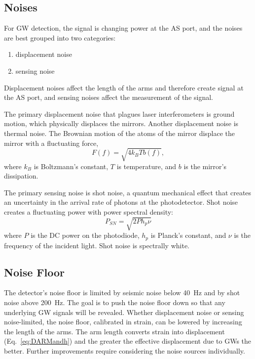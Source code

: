 \subsection{Noises}
For GW detection, the signal is changing power at the AS port, and the
noises are best grouped into two categories:
\begin{enumerate}
\item displacement noise \vspace{-10 pt}
\item sensing noise
\end{enumerate}
Displacement noises affect the length of the arms and therefore create
signal at the AS port, and sensing noises affect the measurement of
the signal. 

The primary displacement noise that plagues laser interferometers is
ground motion, which physically displaces the mirrors. Another
displacement noise is thermal noise. The Brownian motion of the atoms
of the mirror displace the mirror with a fluctuating force,
\begin{equation}
F(f) = \sqrt{4k_BTb(f)},
\end{equation}
where $k_B$ is Boltzmann's constant, $T$ is temperature, and $b$ is
the mirror's dissipation.

The primary sensing noise is shot noise, a quantum mechanical effect
that creates an uncertainty in the arrival rate of photons at the
photodetector. Shot noise creates a fluctuating power with power
spectral density:
\begin{equation}
P_{SN} = \sqrt{2 P h_p \nu}
\label{eq:shotnoise}
\end{equation}
where $P$ is the DC power on the photodiode, $h_p$ is Planck's
constant, and $\nu$ is the frequency of the incident light. Shot noise
is spectrally white.

\subsection{Noise Floor}
The detector's noise floor is limited by seismic noise below 40~Hz and
by shot noise above 200~Hz. The goal is to push the noise floor down
so that any underlying GW signals will be revealed. Whether
displacement noise or sensing noise-limited, the noise floor,
calibrated in strain, can be lowered by increasing the length of the
arms. The arm length converts strain into displacement
(Eq.~\ref{eq:DARMandh}) and the greater the effective displacement due
to GWs the better. Further improvements require considering the noise
sources individually.

